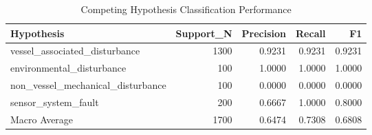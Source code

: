 \begin{table}[htbp]
\centering
\caption{Competing Hypothesis Classification Performance}
\begin{tabular}{lrrrr}
\toprule
Hypothesis & Support\_N & Precision & Recall & F1 \\
\midrule
vessel\_associated\_disturbance & 1300 & 0.9231 & 0.9231 & 0.9231 \\
environmental\_disturbance & 100 & 1.0000 & 1.0000 & 1.0000 \\
non\_vessel\_mechanical\_disturbance & 100 & 0.0000 & 0.0000 & 0.0000 \\
sensor\_system\_fault & 200 & 0.6667 & 1.0000 & 0.8000 \\
Macro Average & 1700 & 0.6474 & 0.7308 & 0.6808 \\
\bottomrule
\end{tabular}
\end{table}
